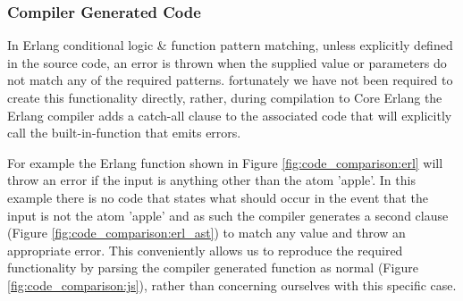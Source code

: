 \documentclass[twoside,12pt,titlepage,a4paper]{article}
\begin{document}
\subsubsection{Compiler Generated Code}
In Erlang conditional logic \& function pattern matching, unless explicitly defined in the source code, an error is thrown when the supplied value or parameters do not match any of the required patterns. fortunately we have not been required to create this functionality directly, rather, during compilation to Core Erlang the Erlang compiler adds a catch-all clause to the associated code that will explicitly call the built-in-function that emits errors.

For example the Erlang function shown in Figure \ref{fig:code_comparison:erl} will throw an error if the input is anything other than the atom 'apple'. In this example there is no code that states what should occur in the event that the input is not the atom 'apple' and as such the compiler generates a second clause (Figure \ref{fig:code_comparison:erl_ast}) to match any value and throw an appropriate error. This conveniently allows us to reproduce the required functionality by parsing the compiler generated function as normal (Figure \ref{fig:code_comparison:js}), rather than concerning ourselves with this specific case.
\end{document}
